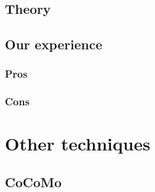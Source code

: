 \subsection{Theory}

\subsection{Our experience}

\subsubsection{Pros}

\subsubsection{Cons}

\section{Other techniques}
\subsection{CoCoMo}